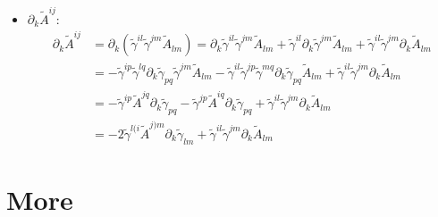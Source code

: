 \documentclass[prd,aps,a4paper,superscriptaddress,onecolumn,footinbib]{revtex4}
\begin{document}
\begin{itemize}
\item $\partial_k\tilde{A}^{ij}$:
  \begin{align}
    \partial_k\tilde{A}^{ij}
    &=\partial_k
    \left(
      \tilde\gamma^{il}\tilde\gamma^{jm}\tilde{A}_{lm}
    \right)
    =
    \partial_k\tilde\gamma^{il}\tilde\gamma^{jm}\tilde{A}_{lm}+
    \tilde\gamma^{il}\partial_k\tilde\gamma^{jm}\tilde{A}_{lm}+
    \tilde\gamma^{il}\tilde\gamma^{jm}\partial_k\tilde{A}_{lm}
    \\
    &=
    -\tilde\gamma^{ip}\tilde\gamma^{lq}\partial_k\tilde\gamma_{pq}\tilde\gamma^{jm}\tilde{A}_{lm}
    -\tilde\gamma^{il}\tilde\gamma^{jp}\tilde\gamma^{mq}\partial_k\tilde\gamma_{pq}\tilde{A}_{lm}
    +\tilde\gamma^{il}\tilde\gamma^{jm}\partial_k\tilde{A}_{lm}
    \\
    &=
    -\tilde\gamma^{ip}\tilde{A}^{jq}\partial_k\tilde\gamma_{pq}
    -\tilde\gamma^{jp}\tilde{A}^{iq}\partial_k\tilde\gamma_{pq}
    +\tilde\gamma^{il}\tilde\gamma^{jm}\partial_k\tilde{A}_{lm}
    \\
    &=
    -2\tilde\gamma^{l(i}\tilde{A}^{j)m}\partial_k\tilde\gamma_{lm}
    +\tilde\gamma^{il}\tilde\gamma^{jm}\partial_k\tilde{A}_{lm}
  \end{align}
\end{itemize}


\section{More}
\cite{alexander1990solving}





\end{document}
